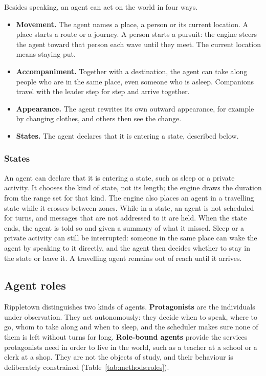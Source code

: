 Besides speaking, an agent can act on the world in four ways.
\begin{itemize}
  \item \textbf{Movement.} The agent names a place, a person or its current location. A place starts a route or a journey. A person starts a pursuit: the engine steers the agent toward that person each wave until they meet. The current location means staying put.
  \item \textbf{Accompaniment.} Together with a destination, the agent can take along people who are in the same place, even someone who is asleep. Companions travel with the leader step for step and arrive together.
  \item \textbf{Appearance.} The agent rewrites its own outward appearance, for example by changing clothes, and others then see the change.
  \item \textbf{States.} The agent declares that it is entering a state, described below.
\end{itemize}

\subsubsection{States}
\label{sec:methods:states}

An agent can declare that it is entering a state, such as sleep or a private activity. It chooses the kind of state, not its length; the engine draws the duration from the range set for that kind. The engine also places an agent in a travelling state while it crosses between zones. While in a state, an agent is not scheduled for turns, and messages that are not addressed to it are held. When the state ends, the agent is told so and given a summary of what it missed. Sleep or a private activity can still be interrupted: someone in the same place can wake the agent by speaking to it directly, and the agent then decides whether to stay in the state or leave it. A travelling agent remains out of reach until it arrives.

\subsection{Agent roles}
\label{sec:methods:roles}

Rippletown distinguishes two kinds of agents. \textbf{Protagonists} are the individuals under observation. They act autonomously: they decide when to speak, where to go, whom to take along and when to sleep, and the scheduler makes sure none of them is left without turns for long. \textbf{Role-bound agents} provide the services protagonists need in order to live in the world, such as a teacher at a school or a clerk at a shop. They are not the objects of study, and their behaviour is deliberately constrained (Table~\ref{tab:methods:roles}).

